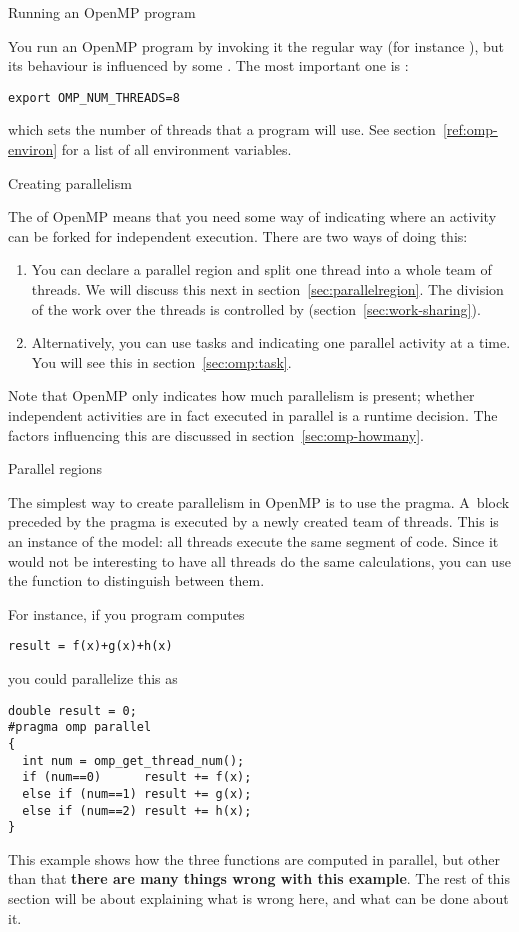  {Running an OpenMP program}

You run an OpenMP program by invoking it the regular way (for instance ),
but its behaviour is influenced by some .
The most important one is :
\begin{verbatim}
export OMP_NUM_THREADS=8
\end{verbatim}
which sets the number of threads that a program will use.
See section~\ref{ref:omp-environ} for a list of all environment variables.

 {Creating parallelism}

The  of OpenMP means that you need some way of
indicating where an activity can be forked for independent execution.
There are two ways of doing this:
\begin{enumerate}
\item You can declare a parallel region and
  split one thread into a whole team of threads. We will discuss this next
  in section~\ref{sec:parallelregion}. The division of the work over the threads
  is controlled by  (section~\ref{sec:work-sharing}).
\item Alternatively, you can use tasks and indicating one parallel
  activity at a time. You will see this in section~\ref{sec:omp:task}.
\end{enumerate}

Note that OpenMP only indicates how much parallelism is present;
whether independent activities are in fact executed in parallel
is a runtime decision. The factors influencing this are discussed
in section~\ref{sec:omp-howmany}.

 {Parallel regions}

The simplest way to create parallelism in OpenMP is to use
the  pragma. A~block preceded by the  pragma
is executed by a newly created team of threads. 
This is an instance of the  model: all threads execute the same
segment of code.
Since it would not be interesting to have all threads do the same calculations,
you can use the function  to distinguish 
between them.

For instance, if you program computes
\begin{verbatim}
result = f(x)+g(x)+h(x)
\end{verbatim}
you could parallelize this as
\begin{verbatim}
double result = 0;
#pragma omp parallel
{
  int num = omp_get_thread_num();
  if (num==0)      result += f(x);
  else if (num==1) result += g(x);
  else if (num==2) result += h(x);
}
\end{verbatim}
This example shows how the three functions are computed in parallel,
but other than that \textbf{there are many things wrong with this example}.
The rest of this section will be about explaining what is wrong here,
and what can be done about it.

